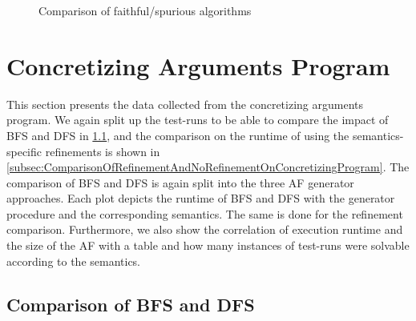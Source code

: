 \begin{figure}[H]
\begin{subfigure}[t]{0.45\textwidth}
        \label{fig:expfaithful/SATnoSATDFS}
    \end{subfigure}
    \caption{Comparison of faithful/spurious algorithms}
    \label{fig:expfaithful/SATnoSATDiff}
\end{figure}





\section{Concretizing Arguments Program}
\label{sec:ConcretizingArgumentsProgram}

This section presents the data collected from the concretizing arguments program. We again split up the test-runs to be able to compare the impact of BFS and DFS in \cref{subsec:ComparisonOfBFSandDFSApproachForConretizingArguments}, and the comparison on the runtime of using the semantics-specific refinements is shown in \cref{subsec:ComparisonOfRefinementAndNoRefinementOnConcretizingProgram}. The comparison of BFS and DFS is again split into the three AF generator approaches. Each plot depicts the runtime of BFS and DFS with the generator procedure and the corresponding semantics. The same is done for the refinement comparison. Furthermore, we also show the correlation of execution runtime and the size of the AF with a table and how many instances of test-runs were solvable according to the semantics.


\subsection{Comparison of BFS and DFS}
\label{subsec:ComparisonOfBFSandDFSApproachForConretizingArguments}


